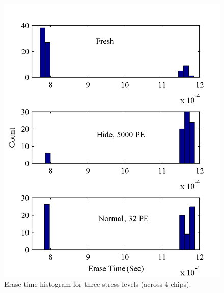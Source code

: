 \begin{figure} 
\begin{center} 
\includegraphics[width=\mywidth]{figs/erasetime_hist.png} 
\caption{Erase time histogram for three stress levels (across 4 chips).}
\label{fig:etime_histo} 
\vspace{-0.1in}

\end{center} 
\end{figure}

 
